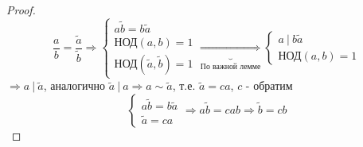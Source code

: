 \documentclass[a4paper, 12pt]{article}
\theoremstyle{definition}
\begin{document}
  \begin{proof}
    $$\frac{a}{b} = \frac{\widetilde{a}}{\widetilde{b}} \Longrightarrow \begin{cases}
      a \widetilde{b} = b \widetilde{a}\\
      \text{НОД}(a, b) = 1\\
      \text{НОД}(\widetilde{a}, \widetilde{b}) = 1
    \end{cases} \underbrace{\Longrightarrow }_{\text{По важной лемме}} \begin{cases}
      a \ | \ b \widetilde{a}\\
      \text{НОД}(a, b) = 1
    \end{cases}$$
    $\Longrightarrow a \ | \ \widetilde{a}$, аналогично $\widetilde{a} \ | \ a \Longrightarrow a \sim \widetilde{a}$, т.е. $\widetilde{a} = ca$, $c$ - обратим
    $$\begin{cases}
      a \widetilde{b} = b \widetilde{a}\\
      \widetilde{a} = ca
    \end{cases} \Longrightarrow a \widetilde{b} = cab \Longrightarrow \widetilde{b} = cb$$
  \end{proof}
\end{document}
